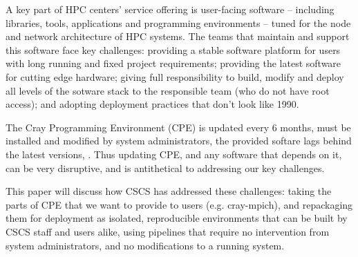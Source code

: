 A key part of HPC centers' service offering is user-facing software -- including libraries, tools, applications and programming environments -- tuned for the node and network architecture of HPC systems.
The teams that maintain and support this software face key challenges: providing a stable software platform for users with long running and fixed project requirements;  providing the latest software for cutting edge hardware; giving full responsibility to build, modify and deploy all levels of the sotware stack to the responsible team (who do not have root access); and adopting deployment practices that don't look like 1990.

The Cray Programming Environment (CPE) is updated every 6 months, must be installed and modified by system administrators, the provided softare lags behind the latest versions, . Thus updating CPE, and any software that depends on it, can be very disruptive, and is antithetical to addressing our key challenges.

This paper will discuss how CSCS has addressed these challenges:
taking the parts of CPE that we want to provide to users (e.g. cray-mpich), and repackaging them for deployment as isolated, reproducible environments that can be built by CSCS staff and users alike, using pipelines that require no intervention from system administrators, and no modifications to a running system.

